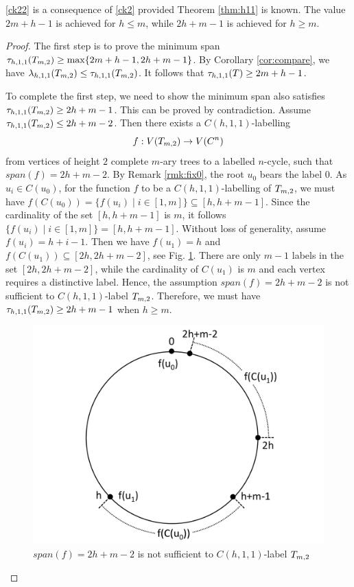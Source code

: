 \eqref{ck22} is a consequence of \eqref{ck2} provided Theorem \ref{thm:h11} is known. The value $2m+h-1$ is achieved for $h\le m$, while $2h+m-1$ is achieved for $h \ge m$. 
\\
\begin{proof} The first step is to prove the minimum span $\t_{h,1,1}(\tm2) \ge  \max\{2m+h-1, 2h+m-1\}$. By Corollary \ref{cor:compare}, we have $\lambda_{h,1,1}(\tm2) \le \t_{h,1,1}(\tm2)$. It follows that $\tau_{h,1,1}(T) \ge 2m+h-1$. 

To complete the first step, we need to show the minimum span also satisfies $\t_{h,1,1}(\tm2) \ge 2h+m-1$. This can be proved by contradiction. Assume $\th11(\tm2) \le 2h+m-2$. Then there exists a $C(h,1,1)$-labelling 
\[
f:V(\tm2) \rightarrow V(C^n)
\]
from vertices of height $2$ complete $m$-ary trees to a labelled $n$-cycle, such that $span(f) = 2h+m-2$. By Remark \ref{rmk:fix0}, the root $u_0$ bears the label $0$. As $u_i \in C(u_0)$, for the function $f$ to be a $C(h,1,1)$-labelling of $\tm2$, we must have $f(C(u_0))=\{f(u_{i}) \mid i \in [1,m]\} \subseteq [h, h+m-1]$. Since the cardinality of the set $[h, h+m-1]$ is $m$, it follows $\{f(u_{i}) \mid i \in [1,m]\} = [h, h+m-1]$. Without loss of generality, assume $f(u_i) = h+i-1$. Then we have $f(u_1) = h$ and $f(C(u_1)) \subseteq [2h, 2h+m-2]$, see Fig. \ref{4.3}. There are only $m-1$ labels in the set $[2h, 2h+m-2]$, while the cardinality of $C(u_1)$ is $m$ and each vertex requires a distinctive label. Hence, the assumption $span(f) = 2h+m-2$ is not sufficient to $C(h,1,1)$-label $\tm2$. Therefore, we must have $\t_{h,1,1}(\tm2) \ge 2h+m-1$ when $h \ge m$.
\begin{figure}
  \centering
     \vspace{-0pt}
    \includegraphics[scale=0.35]{../figures/fig4-4.pdf}
    \vspace{-0pt}
\caption{$span(f) = 2h+m-2$ is not sufficient to $C(h,1,1)$-label $\tm2$}
\label{4.3}
\end{figure}


\end{proof}
